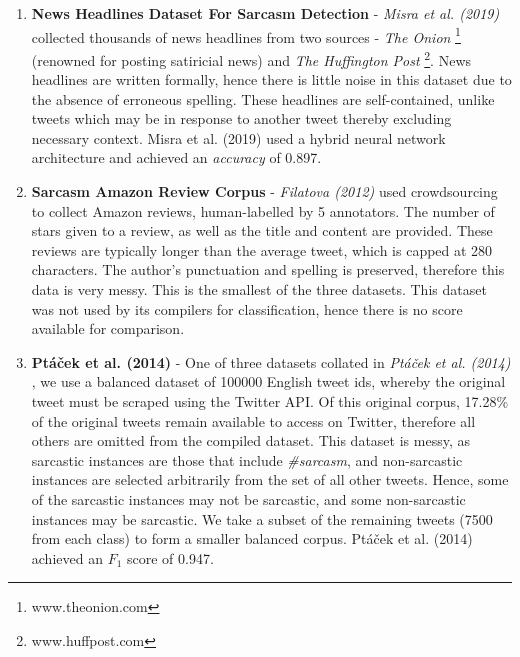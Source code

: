 \documentclass[12pt,a4paper]{article}
\begin{document}
\begin{enumerate}[leftmargin=0cm]
	\item \textbf{News Headlines Dataset For Sarcasm Detection} - \textit{Misra et al. (2019)} \cite{misra2019sarcasm} collected thousands of news headlines from two sources - \textit{The Onion} \footnote{www.theonion.com} (renowned for posting satiricial news) and \textit{The Huffington Post} \footnote{www.huffpost.com}. News headlines are written formally, hence there is little noise in this dataset due to the absence of erroneous spelling. These headlines are self-contained, unlike tweets which may be in response to another tweet thereby excluding necessary context. Misra et al. (2019) \cite{misra2019sarcasm} used a hybrid neural network architecture and achieved an \textit{accuracy} of 0.897.\vspace{-4.2pt}
	
	\item \textbf{Sarcasm Amazon Review Corpus} - \textit{Filatova (2012)} \cite{filatova2012irony} used crowdsourcing to collect Amazon reviews, human-labelled by 5 annotators. The number of stars given to a review, as well as the title and content are provided. These reviews are typically longer than the average tweet, which is capped at 280 characters. The author's punctuation and spelling is preserved, therefore this data is very messy. This is the smallest of the three datasets. This dataset was not used by its compilers for classification, hence there is no score available for comparison.\vspace{-4.2pt}
	
	\item \textbf{Pt\'a\v{c}ek et al. (2014)} - One of three datasets collated in \textit{Pt\'a\v{c}ek et al. (2014)} \cite{ptavcek2014sarcasm}, we use a balanced dataset of 100000 English tweet ids, whereby the original tweet must be scraped using the Twitter API. Of this original corpus, 17.28\% of the original tweets remain available to access on Twitter, therefore all others are omitted from the compiled dataset. This dataset is messy, as sarcastic instances are those that include \textit{\#sarcasm}, and non-sarcastic instances are selected arbitrarily from the set of all other tweets. Hence, some of the sarcastic instances may not be sarcastic, and some non-sarcastic instances may be sarcastic. We take a subset of the remaining tweets (7500 from each class) to form a smaller balanced corpus. Pt\'a\v{c}ek et al. (2014) \cite{ptavcek2014sarcasm} achieved an $F_{1}$ score of 0.947.
\end{enumerate}
\end{document}
